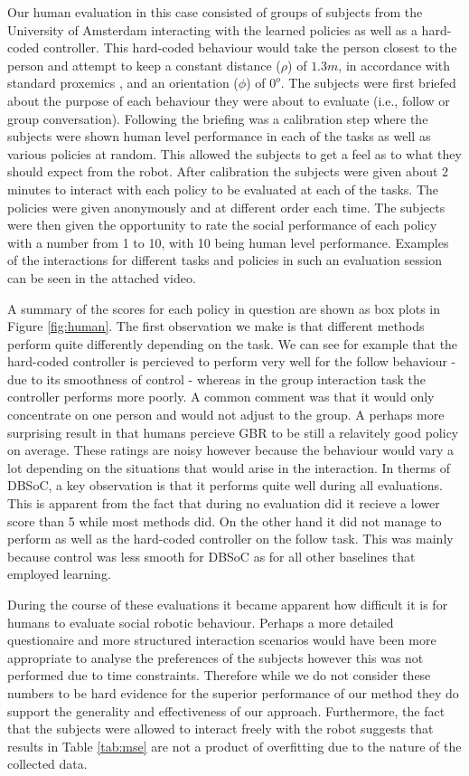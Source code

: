 \documentclass[letterpaper, 10 pt, conference]{ieeeconf}
\begin{document}
Our human evaluation in this case consisted of groups of subjects from the University of Amsterdam interacting with the learned policies as well as a hard-coded controller. This hard-coded behaviour would take the person closest to the person and attempt to keep a constant distance ($\rho$) of $1.3m$, in accordance with standard proxemics \cite{hall1966hidden}, and an orientation ($\phi$) of $0^o$. The subjects were first briefed about the purpose of each behaviour they were about to evaluate (i.e., follow or group conversation). Following the briefing was a calibration step where the subjects were shown human level performance in each of the tasks as well as various policies at random. This allowed the subjects to get a feel as to what they should expect from the robot. After calibration the subjects were given about 2 minutes to interact with each policy to be evaluated at each of the tasks. The policies were given anonymously and at different order each time. The subjects were then given the opportunity to rate the social performance of each policy with a number from 1 to 10, with 10 being human level performance. Examples of the interactions for different tasks and policies in such an evaluation session can be seen in the attached video.

A summary of the scores for each policy in question are shown as box plots in Figure \ref{fig:human}. The first observation we make is that different methods perform quite differently depending on the task. We can see for example that the hard-coded controller is percieved to perform very well for the follow behaviour - due to its smoothness of control - whereas in the group interaction task the controller performs more poorly. A common comment was that it would only concentrate on one person and would not adjust to the group. A perhaps more surprising result in that humans percieve GBR to be still a relavitely good policy on average. These ratings are noisy however because the behaviour would vary a lot depending on the situations that would arise in the interaction. In therms of DBSoC, a key observation is that it performs quite well during all evaluations. This is apparent from the fact that during no evaluation did it recieve a lower score than 5 while most methods did. On the other hand it did not manage to perform as well as the hard-coded controller on the follow task. This was mainly because control was less smooth for DBSoC as for all other baselines that employed learning.

During the course of these evaluations it became apparent how difficult it is for humans to evaluate social robotic behaviour. Perhaps a more detailed questionaire and more structured interaction scenarios would have been more appropriate to analyse the preferences of the subjects however this was not performed due to time constraints. Therefore while we do not consider these numbers to be hard evidence for the superior performance of our method they do support the generality and effectiveness of our approach. Furthermore, the fact that the subjects were allowed to interact freely with the robot suggests that results in Table \ref{tab:mse} are not a product of overfitting due to the nature of the collected data. 
\end{document}
